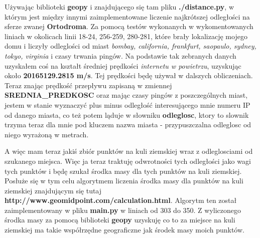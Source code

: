 \documentclass[11pt,a4paper]{article}
\begin{document}
Używając biblioteki \textbf{geopy} i znajdującego się tam pliku \textbf{./distance.py}, w którym jest między innymi zaimplementowane liczenie najkrótszej odległości na sferze zwanej \textbf{Ortodroma}. Za pomocą testów wykonanych w wykomentowanych liniach w okolicach linii 18-24, 256-259, 280-281, które brały lokalizację mojego domu i liczyły odleglości od miast \textit{bombay, california, frankfurt, saopaulo, sydney, tokyo, virginia} i czasy trwania pingów. Na podstawie tak zebranych danych uzyskałem coś na kształt
średniej prędkości \textit{internetu w powietrzu}, uzyskując około \textbf{20165129.2815 m/s}. Tej prędkości będę używał w dalszych obliczeniach. Teraz znając prędkość przepływu zapisaną w zmiennej \textbf{SREDNIA\_PREDKOSC} oraz mając czasy pingów z poszczególnych miast, jestem w stanie wyznaczyć plus minus odległość interesującego mnie numeru IP od danego miasta, co też potem ląduje w słowniku \textbf{odleglosc}, ktory to slownik trzyma teraz dla mnie pod kluczem nazwa miasta - przypuszczalna odleglosc od niego wyrażoną w metrach.

A więc mam teraz jakiś zbiór punktów na kuli ziemskiej wraz z odleglosciami od szukanego miejsca. Więc ja teraz traktuję odwrotności tych odległości jako wagi tych punktów i będę szukał środka masy dla tych punktów na kuli ziemskiej. Posłuże się w tym celu algorytmem liczenia środka masy dla punktów na kuli ziemskiej znajdującym się tutaj \textbf{http://www.geomidpoint.com/calculation.html}. Algorytm ten został zaimplementowany w pliku \textbf{main.py} w liniach od 303 do 350. Z wyliczonego środka masy za pomocą biblioteki \textbf{geopy} uzyskuję co to za miejsce na kuli ziemskiej ma takie współrzędne geograficzne jak środek masy moich punktów.
\end{document}
